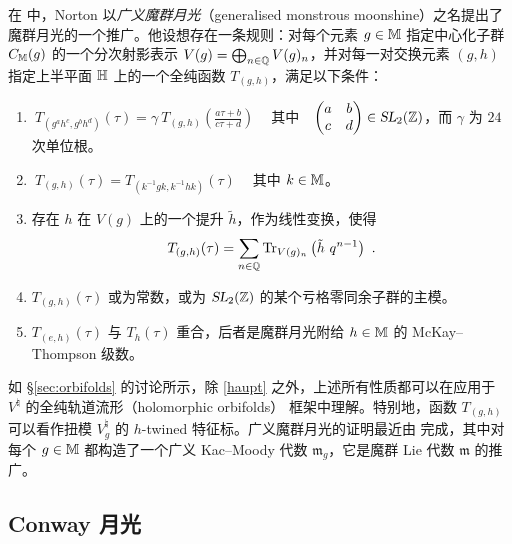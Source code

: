 
在 \cite{generalized_moonshine} 中，Norton 以\emph{广义魔群月光}（generalised monstrous moonshine）之名提出了魔群月光的一个推广。他设想存在一条规则：对每个元素 $g\in\mathbb{M}$ 指定中心化子群 $C_{\mathbb{M}}(g)$ 的一个分次射影表示 $V(g)=\bigoplus_{n\in\mathbb{Q}}V(g)_n$，并对每一对交换元素 $(g,h)$ 指定上半平面 $\mathbb{H}$ 上的一个全纯函数 $T_{(g,h)}$，满足以下条件：
\begin{enumerate}[label=(\roman*)]
\item 
$~T_{\left(g^ah^c,g^bh^d\right)}(\tau)=\gamma ~T_{(g,h)}\left(\frac{a\tau+b}{c\tau+d}\right)~~~~$ 其中 $~~\begin{pmatrix} a &b \\ c&d\end{pmatrix}\in\operatorname{\textsl{SL}}_2(\mathbb{Z})$，而 $\gamma$ 为 $24$ 次单位根。
\item $~T_{\left(g,h\right)}(\tau)=T_{\left(k^{-1}gk,k^{-1}hk\right)}(\tau)~~~~$ 其中 $k\in\mathbb{M}$。
\item 存在 $h$ 在 $V(g)$ 上的一个提升 $\tilde{h}$，作为线性变换，使得
\begin{equation}
T_{(g,h)}(\tau)=\sum_{n\in\mathbb{Q}}\operatorname{Tr}_{V(g)_n}\left(\tilde{h}~q^{n-1}\right)~.
\end{equation}
\item \label{haupt} $T_{(g,h)}(\tau)$ 或为常数，或为 $\operatorname{\textsl{SL}}_2(\mathbb{Z})$ 的某个亏格零同余子群的主模。
\item $T_{(e,h)}(\tau)$ 与 $T_h(\tau)$ 重合，后者是魔群月光附给 $h\in\mathbb{M}$ 的 McKay–Thompson 级数。
\end{enumerate}


如 \S\ref{sec:orbifolds} 的讨论所示，除 \ref{haupt} 之外，上述所有性质都可以在应用于 $V^\natural$ 的全纯轨道流形（holomorphic orbifolds）\cite{DixonL.1988Batb} 框架中理解。特别地，函数 $T_{(g,h)}$ 可以看作扭模 $V^\natural_g$ 的 $h$-twined 特征标。广义魔群月光的证明最近由 \cite{carnahan2012generalized} 完成，其中对每个 $g\in \mathbb{M}$ 都构造了一个广义 Kac–Moody 代数 ${\mathfrak m}_g$，它是魔群 Lie 代数 $\mathfrak{m}$ 的推广。


\subsection{Conway 月光}
\label{sec:conway_moonshine}

